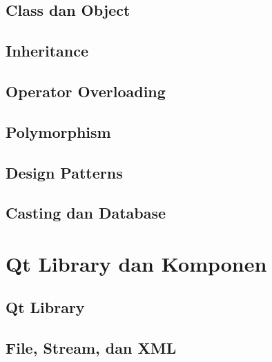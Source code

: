 \documentclass[11pt,b5paper,twoside,titlepage]{book}
\begin{document}
	\chapter{Class dan Object}\label{class-dan-object}
	

	\chapter{Inheritance}\label{inheritance}
	

	\chapter{Operator Overloading}\label{operator-overloading}
	

	\chapter{Polymorphism}\label{polymorphism}
	

	\chapter{Design Patterns}\label{design-patterns}
	

	\chapter{Casting dan Database}\label{casting-dan-database}
	

	\part{Qt Library dan Komponen}\label{part-qt-library}

	\chapter{Qt Library}\label{qt-library}
	

	\chapter{File, Stream, dan XML}\label{file-stream-dan-xml}
	
\end{document}
